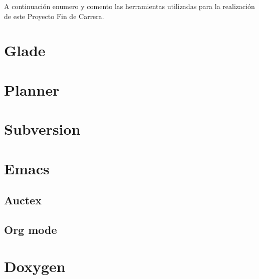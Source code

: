 

A continuación enumero y comento las herramientas utilizadas para la
realización de este Proyecto Fin de Carrera.

\section*{Glade}

\section*{Planner}

\section*{Subversion}

\section*{Emacs}

\subsection*{Auctex}

\subsection*{Org mode}

\section*{Doxygen}
